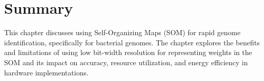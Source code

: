 \section{Summary}
\begin{comment}
In this work we explore the design space of a self-organizing map (SOM) used for rapid and accurate identification of bacterial genomes. This is an important health care problem.  The  SOM is trained on Next Generation Sequencing (NGS) data and is able to identify the exact strain of bacteria. This is in contrast to conventional methods that require genome assembly to identify the bacterial strain. In this work SOM has been implemented on FPGA. To lower the energy consumption, we exploit the robustness of SOM by successively lowering the resolution to gain further improvements in efficiency and lower the implementation cost without substantially sacrificing the accuracy. We do an in depth analysis of the reduction in resolution vs. loss in accuracy as the basis for designing a system with the lowest cost and acceptable accuracy using NGS data from  samples containing multiple bacteria from the labs of one of the co-authors. The objective of this method is to design a bacterial recognition system for battery operated clinical use where the area, power and performance are of critical importance. We demonstrate that with 39\% loss in accuracy in 12 bits and 1\% in 16 bit representation can yield significant savings in energy and area.

In this work, different bit width FPGA designs of SOM were implemented to enable trade-offs between accuracy and computation cost. Experiments has shown the big design space, resulting in different cost in terms of timing, area as well as energy, all of which are affected significantly by the fixed-point format representation. Through the experiment, we conclude that the SOM network with 16-bit fixed-point representation implemented on FPGA, has better benefits compared to other fixed-point formats with more bits. And 16-bit has acceptable classification error. Format with bits more than 16 no longer add any benefit to lower the classification error. 

In future works, we plan to apply more sophisticated methods to scale down the bit width without losing too much accuracy. For example, the weights can be dynamically scaled after several epochs of training when the current fixed point format is not suitable anymore. We are confident that, with such approximate computing techniques, we could possibly reduce the resolution to 8 bits with acceptable loss of accuracy and, by extension, the implementation cost of SOM networks on hardware.
\end{comment}
This chapter discusses using Self-Organizing Maps (SOM) for rapid genome identification, specifically for bacterial genomes. The chapter explores the benefits and limitations of using low bit-width resolution for representing weights in the SOM and its impact on accuracy, resource utilization, and energy efficiency in hardware implementations.

